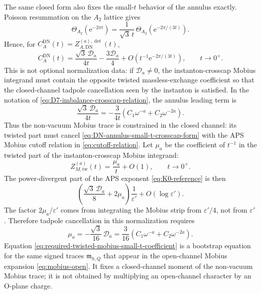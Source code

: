 \documentclass[11pt]{article}
\newcommand{\DN}{\mathrm{DN}}
\newcommand{\e}{\mathrm{e}}
\newcommand{\eps}{\varepsilon}
\begin{document}
The same closed form also fixes the small-\(t\) behavior of the annulus exactly. Poisson
resummation on the \(A_2\) lattice gives
\begin{equation}
  \Theta_{A_2}(\e^{-2\pi t})
  =
  \frac{1}{\sqrt3\,t}\,
  \Theta_{A_2}(\e^{-2\pi/(3t)}).
  \label{eq:A2-theta-modular-transform}
\end{equation}
Hence, for \(C_A^{\DN}(t)=Z_{A,\DN}^{(a),\det}(t)\),
\begin{equation}
  C_A^{\DN}(t)
  =
  \frac{\sqrt3\,\mathcal D_a}{4t}
  -
  \frac{3\mathcal D_a}{4}
  +
  O\!\left(t^{-1}\e^{-2\pi/(3t)}\right),
  \qquad t\to0^+ .
  \label{eq:DN-annulus-A2-small-t}
\end{equation}
This is not optional normalization data: if \(\mathcal D_a\ne0\), the instanton-crosscap Mobius
integrand must contain the opposite twisted massless-exchange coefficient so that the
closed-channel tadpole cancellation seen by the instanton is satisfied. In the notation of
\eqref{eq:D7-imbalance-crosscap-relation}, the annulus leading term is
\begin{equation}
  \frac{\sqrt3\,\mathcal D_a}{4t}
  =
  -\frac{3}{4t}\left(C_1\omega^{-a}+C_2\omega^{-2a}\right).
  \label{eq:DN-annulus-small-t-crosscap-form}
\end{equation}
Thus the non-vacuum Mobius trace is constrained in the closed channel: its twisted part must
cancel \eqref{eq:DN-annulus-small-t-crosscap-form} with the APS Mobius cutoff relation in
\eqref{eq:cutoff-relation}. Let \(\mu_a\) be the coefficient of \(t^{-1}\) in the twisted
part of the instanton-crosscap Mobius integrand:
\begin{equation}
  Z_{M,\mathrm{tw}}^{(a)}(t)
  =
  \frac{\mu_a}{t}+O(1),
  \qquad t\to0^+ .
  \label{eq:twisted-mobius-small-t-coefficient-definition}
\end{equation}
The power-divergent part of the APS exponent \eqref{eq:K0-reference} is then
\begin{equation}
  \left(
    \frac{\sqrt3\,\mathcal D_a}{8}
    +
    2\mu_a
  \right)\frac{1}{\eps'}
  +O(\log\eps').
  \label{eq:APS-power-divergence-annulus-mobius}
\end{equation}
The factor \(2\mu_a/\eps'\) comes from integrating the Mobius strip from \(\eps'/4\), not from
\(\eps'\). Therefore tadpole cancellation in this normalization requires
\begin{equation}
  \mu_a
  =
  -\frac{\sqrt3}{16}\,\mathcal D_a
  =
  \frac{3}{16}\left(C_1\omega^{-a}+C_2\omega^{-2a}\right).
  \label{eq:required-twisted-mobius-small-t-coefficient}
\end{equation}
Equation \eqref{eq:required-twisted-mobius-small-t-coefficient} is a bootstrap equation for the
same signed traces \(\mathfrak m_{h,Q}\) that appear in the open-channel Mobius expansion
\eqref{eq:mobius-open}. It fixes a closed-channel moment of the non-vacuum Mobius trace; it is
not obtained by multiplying an open-channel character by an O-plane charge.
\end{document}
